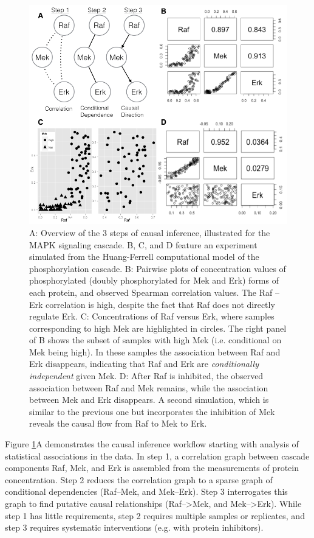 \documentclass[journal=jacsat,manuscript=article]{achemso}
\begin{document}
\begin{figure}[!tpb]
\centerline{\includegraphics[width=1\textwidth]{figs/mapk.png}}
\caption{A: Overview of the 3 steps of causal inference, illustrated for the MAPK signaling cascade.    B, C, and D feature an experiment simulated from the Huang-Ferrell computational model of the phosphorylation cascade.  B: Pairwise plots of concentration values of phosphorylated (doubly phosphorylated for Mek and Erk) forms of each protein, and observed Spearman correlation values.  The Raf -- Erk correlation is high, despite the fact that Raf does not directly regulate Erk.  C: Concentrations of Raf versus Erk, where samples corresponding to high Mek are highlighted in circles.  The right panel of B shows the subset of samples with high Mek (i.e. conditional on Mek being high). In these samples the association between Raf and Erk disappears, indicating that Raf and Erk are {\it conditionally independent} given Mek.  D: After Raf is inhibited, the observed association between Raf and Mek remains, while the association between Mek and Erk disappears. A second simulation, which is similar to the previous one but incorporates the inhibition of Mek reveals the causal flow from Raf to Mek to Erk.
\label{mapkInference}}
\end{figure}


Figure \ref{mapkInference}A demonstrates the causal inference workflow starting with analysis of statistical associations in the data.  In step 1, a correlation graph between cascade components Raf, Mek, and Erk is assembled from the measurements of protein concentration.  Step 2 reduces the correlation graph to a sparse graph of conditional dependencies (Raf--Mek, and Mek--Erk).  Step 3 interrogates this graph to find putative causal relationships (Raf-->Mek, and Mek-->Erk).  While step 1 has little requirements, step 2 requires multiple samples or replicates, and step 3 requires systematic interventions (e.g. with protein inhibitors). 
\end{document}
